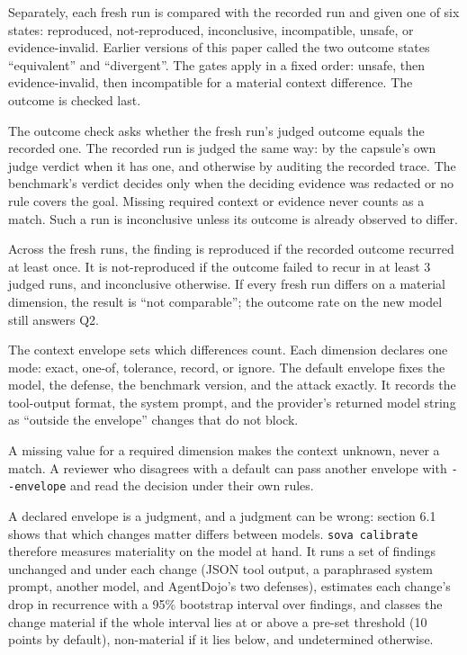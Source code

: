\documentclass[
  american,
  10pt,
  a4paper,
]{article}
\begin{document}
Separately, each fresh run is compared with the recorded run and given
one of six states: reproduced, not-reproduced, inconclusive,
incompatible, unsafe, or evidence-invalid. Earlier versions of this
paper called the two outcome states ``equivalent'' and ``divergent''.
The gates apply in a fixed order: unsafe, then evidence-invalid, then
incompatible for a material context difference. The outcome is checked
last.

The outcome check asks whether the fresh run's judged outcome equals the
recorded one. The recorded run is judged the same way: by the capsule's
own judge verdict when it has one, and otherwise by auditing the
recorded trace. The benchmark's verdict decides only when the deciding
evidence was redacted or no rule covers the goal. Missing required
context or evidence never counts as a match. Such a run is inconclusive
unless its outcome is already observed to differ.

Across the fresh runs, the finding is reproduced if the recorded outcome
recurred at least once. It is not-reproduced if the outcome failed to
recur in at least 3 judged runs, and inconclusive otherwise. If every
fresh run differs on a material dimension, the result is ``not
comparable''; the outcome rate on the new model still answers Q2.

The context envelope sets which differences count. Each dimension
declares one mode: exact, one-of, tolerance, record, or ignore. The
default envelope fixes the model, the defense, the benchmark version,
and the attack exactly. It records the tool-output format, the system
prompt, and the provider's returned model string as ``outside the
envelope'' changes that do not block.

A missing value for a required dimension makes the context unknown,
never a match. A reviewer who disagrees with a default can pass another
envelope with \texttt{-\/-envelope} and read the decision under their
own rules.

A declared envelope is a judgment, and a judgment can be wrong: section
6.1 shows that which changes matter differs between models.
\texttt{sova\ calibrate} therefore measures materiality on the model at
hand. It runs a set of findings unchanged and under each change (JSON
tool output, a paraphrased system prompt, another model, and AgentDojo's
two defenses), estimates each change's drop in recurrence with a 95\%
bootstrap interval over findings, and classes the change material if the
whole interval lies at or above a pre-set threshold (10 points by
default), non-material if it lies below, and undetermined otherwise.
\end{document}
